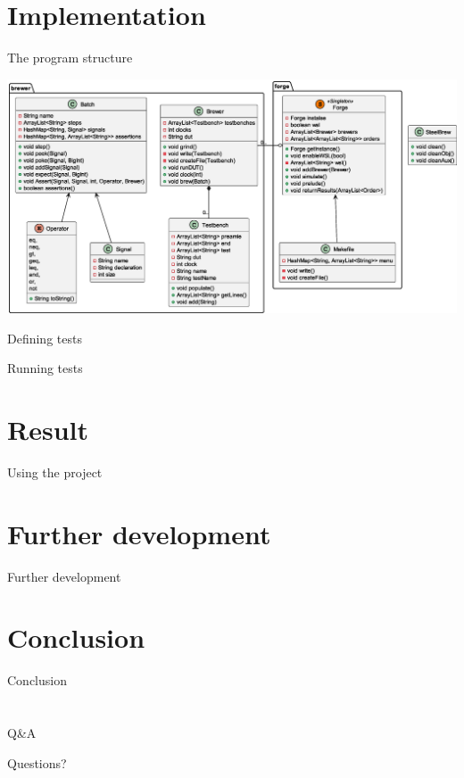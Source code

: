 \documentclass[aspectratio=169, handout]{beamer}
\begin{document}
\section{Implementation}
\begin{frame}{The program structure}
    \begin{center}
        \includegraphics[height=.8\textheight]{out/plantuml/classDiag/classDiag.eps}
    \end{center}
\end{frame}
\begin{frame}{Defining tests}
    
\end{frame}
\begin{frame}{Running tests}
    
\end{frame}
\section{Result}
\begin{frame}{Using the project}

\end{frame}
\section{Further development}
\begin{frame}{Further development}

\end{frame}
\section{Conclusion}
\begin{frame}{Conclusion}

\end{frame}
\section*{}
\begin{frame}[standout]{Q\&A}
    \begin{center}
        Questions?
    \end{center}
\end{frame}
\end{document}
